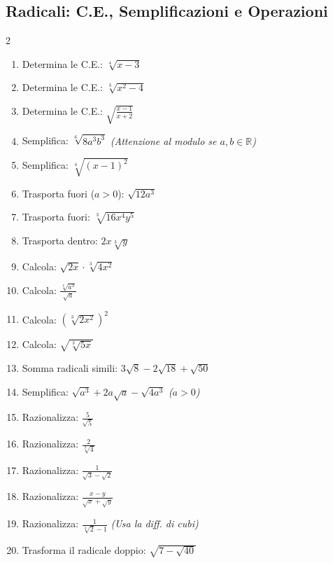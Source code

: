 \subsection{Radicali: C.E., Semplificazioni e Operazioni}
\begin{multicols}{2}
\begin{enumerate}
    \item {} Determina le C.E.: $\sqrt[4]{x-3}$
    \item {} Determina le C.E.: $\sqrt[3]{x^2-4}$
    \item {} Determina le C.E.: $\sqrt{\frac{x-1}{x+2}}$
    \item {} Semplifica: $\sqrt[6]{8a^3b^3}$ \textit{(Attenzione al modulo se $a,b \in \mathbb{R}$)}
    \item {} Semplifica: $\sqrt[4]{(x-1)^2}$
    \item {} Trasporta fuori ($a>0$): $\sqrt{12a^3}$
    \item {} Trasporta fuori: $\sqrt[3]{16x^4y^5}$
    \item {} Trasporta dentro: $2x \sqrt[3]{y}$
    \item {} Calcola: $\sqrt{2x} \cdot \sqrt[3]{4x^2}$
    \item {} Calcola: $\frac{\sqrt[4]{a^3}}{\sqrt{a}}$
    \item {} Calcola: $(\sqrt[3]{2x^2})^2$
    \item {} Calcola: $\sqrt{\sqrt[3]{5x}}$
    \item {} Somma radicali simili: $3\sqrt{8} - 2\sqrt{18} + \sqrt{50}$
    \item {} Semplifica: $\sqrt{a^3} + 2a\sqrt{a} - \sqrt{4a^3}$ \textit{($a>0$)}
    \item {} Razionalizza: $\frac{5}{\sqrt{5}}$
    \item {} Razionalizza: $\frac{2}{\sqrt[3]{4}}$
    \item {} Razionalizza: $\frac{1}{\sqrt{3}-\sqrt{2}}$
    \item {} Razionalizza: $\frac{x-y}{\sqrt{x}+\sqrt{y}}$
    \item {} Razionalizza: $\frac{1}{\sqrt[3]{2}-1}$ \textit{(Usa la diff. di cubi)}
    \item {} Trasforma il radicale doppio: $\sqrt{7 - \sqrt{40}}$
\end{enumerate}
\end{multicols}

